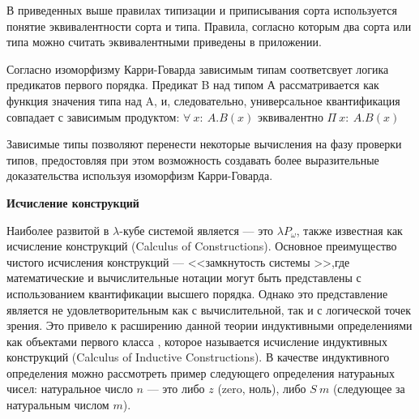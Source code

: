 В приведенных выше правилах типизации и приписывания сорта используется 
понятие эквивалентности сорта и типа. Правила, согласно которым два сорта или 
типа можно считать эквивалентными приведены в приложении.

Согласно изоморфизму Карри-Говарда зависимым типам соответсвует логика 
предикатов первого порядка\cite{lectures, hofmanndt}. Предикат B над типом А рассматривается как 
функция значения типа над A, и, следовательно, универсальное квантификация 
совпадает с зависимым продуктом: $\forall \ x: \  A.B (x)$ эквивалентно $\Pi \ x: \ A.B(x)$


Зависимые типы позволяют перенести некоторые вычисления на фазу проверки 
типов, предостовляя при этом возможность создавать более выразительные 
доказательства используя изоморфизм Карри-Говарда.



\textbf{Исчисление конструкций}

Наиболее развитой в $\lambda$-кубе системой является --- это $\lambda P _{
\omega}$, также известная как исчисление конструкций (Calculus of 
Constructions). 
Основное преимущество чистого исчисления конструкций --- <<замкнутость системы
>>,где математические и вычислительные нотации могут быть представлены с 
использованием квантификации высшего порядка\cite{pauline}. Однако это 
представление является не удовлетворительным как с вычислительной, так и 
с логической точек зрения. Это привело к расширению данной теории индуктивными 
определениями как объектами первого класса \cite{coq, pfenning}, которое 
называется исчисление индуктивных конструкций (Calculus of Inductive 
Constructions).
В качестве индуктивного определения можно рассмотреть пример следующего 
определения натураьных чисел: натуральное число $n$ --- это либо $z$ (zero, 
ноль), либо $S \ m$ (следующее за натуральным числом $m$).

